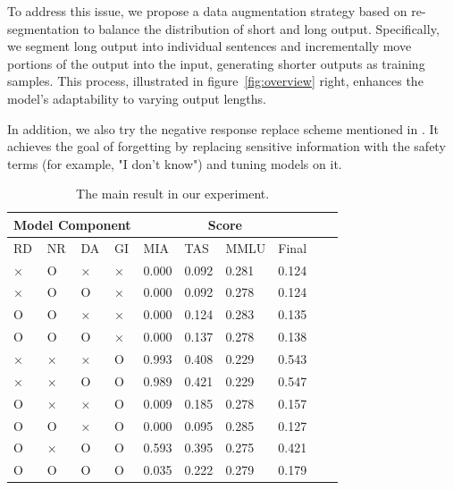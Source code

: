 \documentclass[11pt]{article}
\begin{document}

To address this issue, we propose a data augmentation strategy based on re-segmentation to balance the distribution of short and long output. Specifically, we segment long output into individual sentences and incrementally move portions of the output into the input, generating shorter outputs as training samples. This process, illustrated in figure~\ref{fig:overview} right, enhances the model's adaptability to varying output lengths.

In addition, we also try the negative response replace scheme mentioned in \cite{tofu2024}. It achieves the goal of forgetting by replacing sensitive information with the safety terms (for example, "I don't know") and tuning models on it.

\begin{table}[!t]
  \centering
    \begin{tabular}{llll|llllll}
    \hline
    \multicolumn{4}{c}{\textbf{Model Component}} & \multicolumn{4}{c}{\textbf{Score}} \\ \hline
         RD & NR & DA & GI & MIA & TAS & MMLU & Final \\ \hline
         × & O & × & × & 0.000 & 0.092 & 0.281 & 0.124 \\ \hline
         × & O & O & × & 0.000 & 0.092 & 0.278 & 0.124 \\ \hline
         O & O & × & × & 0.000 & 0.124 & 0.283 & 0.135 \\ \hline
         O & O & O & × & 0.000 & 0.137 & 0.278 & 0.138 \\ \hline
         × & × & × & O & 0.993 & 0.408 & 0.229 & 0.543 \\ \hline
         × & × & O & O & 0.989 & 0.421 & 0.229 & 0.547 \\ \hline
         O & × & × & O & 0.009 & 0.185 & 0.278 & 0.157 \\ \hline
         O & O & × & O & 0.000 & 0.095 & 0.285 & 0.127 \\ \hline
         O & × & O & O & 0.593 & 0.395 & 0.275 & 0.421 \\ \hline
         O & O & O & O & 0.035 & 0.222 & 0.279 & 0.179 \\ \hline
    \end{tabular}
  \caption{
    The main result in our experiment.
  }
  \label{tab:AS2}
\end{table}
\end{document}
